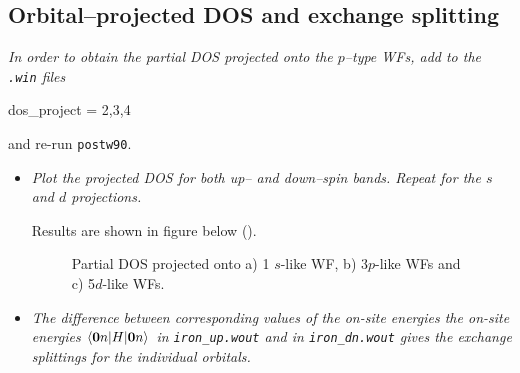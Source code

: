 \subsection*{Orbital--projected DOS and exchange splitting}
{\it In order to obtain the partial DOS projected onto the $p$--type WFs, add to the {\tt .win} files
{\tt

dos\_project = 2,3,4

}
and re-run {\tt postw90}.}
\begin{itemize}
\item {\it Plot the projected DOS for both up-- and down--spin bands. Repeat for the $s$ and $d$ projections.}

Results are shown in figure below ().

\begin{figure}[h!]
\centering
{}
\centering
{}
\centering
{}
\caption{Partial DOS projected onto a) 1 $s$-like WF, b) 3$p$-like WFs and c) 5$d$-like WFs.}\label{fig8.7}
\end{figure}


\item {\it The difference between corresponding values of the on-site energies the on-site energies $\braket{\boldsymbol{0}n\vert H \vert \boldsymbol{0}n}$ in {\tt iron\_up.wout} and in {\tt iron\_dn.wout} gives the exchange splittings for the individual orbitals.}


\end{itemize}
